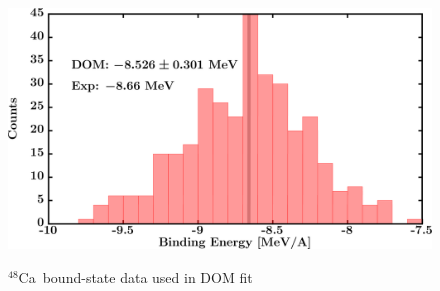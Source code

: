 \documentclass[twocolumn,secnumarabic,amssymb, nobibnotes, aps, prl,
superscriptaddress, nobalancelastpage, draft]{revtex4}
\newcommand{\caEight}{\ensuremath{^{48}}C\lowercase{a}}
\begin{document}
\begin{figure}[!htb]
\begin{minipage}{0.4\linewidth}
        \label{DOM_ca48_RMSRadius}
    \end{minipage}
    \begin{minipage}{0.4\linewidth}
        \centering
        \includegraphics[width=\linewidth]{figures/ca48_BE.png}
        \label{DOM_ca48_BE}
    \end{minipage}
    \caption{\caEight\ bound-state data used in DOM fit}
    \label{DOM_ca48_structural}
\end{figure}
\end{document}
